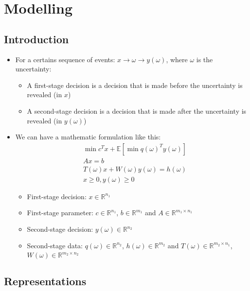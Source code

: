 \documentclass[12pt, openany]{report}
\newcommand{\R}{\mathbb{R}}
\theoremstyle{definition}
\begin{document}
\chapter{Modelling}
\section{Introduction}
\begin{itemize}
	\item  For a certains sequence of events: $x \to \omega \to y(\omega)$, where $\omega$ is the uncertainty:
	\begin{itemize}
		\item A first-stage decision is a decision that is made before the uncertainty is revealed (in $x$)
		\item A second-stage decision is a decision that is made after the uncertainty is revealed (in $y(\omega)$)
	\end{itemize}
	\item We can have a mathematic formulation like this:
	\begin{equation}
		\begin{aligned}
			&\min c^T x + \mathbb{E}[\min q(\omega)^T y(\omega)]\\
			& Ax = b\\
			& T(\omega) x + W(\omega)y(\omega) = h(\omega)\\
			& x \geq 0, y(\omega) \geq 0
		\end{aligned}
	\end{equation}
	\begin{itemize}
		\item First-stage decision: $x \in \R^{n_1}$
		\item First-stage parameter: $c \in \R^{n_1}$, $b \in \R^{m_1}$ and $A \in \R^{m_1 \times n_1}$
		\item Second-stage decision: $y(\omega) \in \R^{n_2}$
		\item Second-stage data: $q(\omega) \in \R^{n_2}$, $h(\omega) \in \R^{m_2}$ and $T(\omega) \in \R^{m_2 \times n_1}$, $W(\omega) \in \R^{m_2 \times n_2}$
	\end{itemize}
\end{itemize}
\section{Representations}
\end{document}
